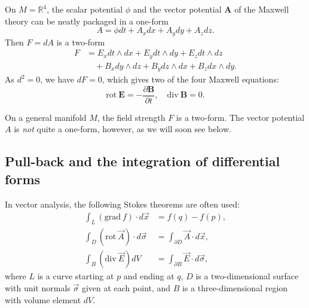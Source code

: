 \documentclass[12pt]{article}
\numberwithin{equation}{section}
\theoremstyle{remark}
\def\bR{\mathbb{R}}
\begin{document}
On $M=\bR^4$,
the scalar potential $\phi$ and the vector potential $\mathbf{A}$ of the Maxwell theory
can be neatly packaged in a one-form \begin{equation}
A = \phi dt + A_x dx + A_y dy + A_z dz.
\end{equation}
Then $F=dA$ is a two-form \begin{equation}
  \begin{aligned}
  F &= 
 E_x dt\wedge dx + E_y dt\wedge dy + E_z dt\wedge dz \\
&\quad + B_x dy\wedge dz + B_y dz\wedge dx + B_z dx\wedge dy .
\end{aligned}
\end{equation}
As $d^2=0$, we have $dF=0$, which gives two of the four Maxwell equations:
\begin{equation}
\mathrm{rot}\ \mathbf{E} = -\frac{\partial \mathbf{B}}{\partial t},\quad
\mathrm{div}\ \mathbf{B} = 0.
\end{equation}

On a general manifold $M$, the field strength $F$ is a two-form.
The vector potential $A$ is \emph{not} quite a one-form, however,
as we will soon see below.

\subsection{Pull-back and the integration of differential forms}

In vector analysis, the following Stokes theorems are often used:
\begin{align}
\int_L (\mathrm{grad}\ f) \cdot d\vec x &= f(q)-f(p), \label{eq:grad-stokes}\\
\int_D (\mathrm{rot}\ \vec A) \cdot d\vec \sigma &= \int_{\partial D} \vec A \cdot d\vec x, \label{eq:rot-stokes}\\
\int_B (\mathrm{div}\ \vec E) dV &= \int_{\partial B} \vec E \cdot d\vec \sigma,\label{eq:div-stokes}
\end{align}
where $L$ is a curve starting at $p$ and ending at $q$,
$D$ is a two-dimensional surface with unit normals $\vec \sigma$ given at each point,
and $B$ is a three-dimensional region with volume element $dV$.
\end{document}
